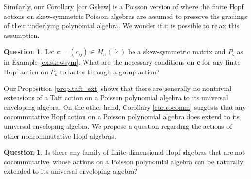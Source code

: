 \documentclass[reqno]{amsart}
\numberwithin{equation}{section}
\theoremstyle{definition}
\newtheorem{question}[theorem]{Question}
\newcommand\kk{\Bbbk}
\newcommand\bc{\mathbf c}
\newcommand\PC{P_\bc}
\begin{document}
Similarly, our Corollary \ref{cor.Gskew} is a Poisson version of \cite[Theorem 1.9]{EW2016} where the finite Hopf actions on skew-symmetric Poisson algebras are assumed to preserve the gradings of their underlying polynomial algebra. We wonder if it is possible to relax this assumption.

\begin{question}
Let $\bc=(c_{ij})\in M_n(\kk)$ be a skew-symmetric matrix and $\PC$ as in Example \ref{ex.skewsym}. What are the necessary conditions on $\bc$ for any finite Hopf action on $\PC$ to factor through a group action?
\end{question}

Our Proposition \ref{prop.taft_ext} shows that there are generally no nontrivial extensions of a Taft action on a Poisson polynomial algebra to its universal enveloping algebra. On the other hand, Corollary \ref{cor.cocomm} suggests that any cocommutative Hopf action on a Poisson polynomial algebra does extend to its universal enveloping algebra. We propose a question regarding the actions of other noncommutative Hopf algebras. 

\begin{question}
Is there any family of finite-dimensional Hopf algebras that are not cocommutative, whose actions on a Poisson polynomial algebra can be naturally extended to its universal enveloping algebra?
\end{question}
\end{document}
